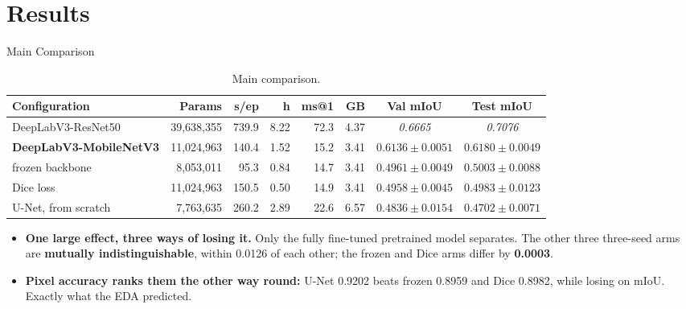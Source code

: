 
\section{Results}

\begin{frame}{Main Comparison}
\begin{table}
\centering
\caption{Main comparison.}
\label{tab:results}
\scriptsize
\begin{tabular}{lrrrrrcc}
\toprule
\textbf{Configuration} & \textbf{Params} & \textbf{s/ep} & \textbf{h} & \textbf{ms@1} & \textbf{GB} & \textbf{Val mIoU} & \textbf{Test mIoU} \\
\midrule
DeepLabV3-ResNet50      & 39{,}638{,}355 & 739.9 & 8.22 & 72.3 & 4.37 & \textit{0.6665} & \textit{0.7076} \\
\textbf{DeepLabV3-MobileNetV3} & 11{,}024{,}963 & 140.4 & 1.52 & 15.2 & 3.41 & $\mathbf{0.6136 \pm 0.0051}$ & $\mathbf{0.6180 \pm 0.0049}$ \\
\quad frozen backbone   &  8{,}053{,}011 &  95.3 & 0.84 & 14.7 & 3.41 & $0.4961 \pm 0.0049$ & $0.5003 \pm 0.0088$ \\
\quad Dice loss         & 11{,}024{,}963 & 150.5 & 0.50 & 14.9 & 3.41 & $0.4958 \pm 0.0045$ & $0.4983 \pm 0.0123$ \\
U-Net, from scratch     &  7{,}763{,}635 & 260.2 & 2.89 & 22.6 & 6.57 & $0.4836 \pm 0.0154$ & $0.4702 \pm 0.0071$ \\
\bottomrule
\end{tabular}
\end{table}

\vspace{-0.15cm}
\footnotesize
\begin{itemize}
    \item \textbf{One large effect, three ways of losing it.} Only the fully fine-tuned pretrained
          model separates. The other three three-seed arms are \textbf{mutually
          indistinguishable}, within 0.0126 of each other; the frozen and Dice arms differ by
          \textbf{0.0003}.
    \item \textbf{Pixel accuracy ranks them the other way round:} U-Net 0.9202 beats frozen 0.8959
          and Dice 0.8982, while losing on mIoU. Exactly what the EDA predicted.
\end{itemize}
\end{frame}

